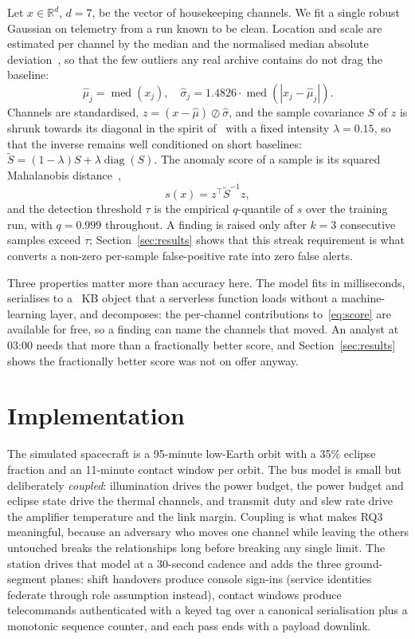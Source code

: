 \documentclass[10pt,journal]{IEEEtran}
\begin{document}
Let $x \in \mathbb{R}^{d}$, $d = 7$, be the vector of housekeeping channels. We
fit a single robust Gaussian on telemetry from a run known to be clean.
Location and scale are estimated per channel by the median and the normalised
median absolute deviation~\cite{rousseeuw1993mad}, so that the few outliers any
real archive contains do not drag the baseline:
\begin{equation}
\hat{\mu}_j = \operatorname{med}(x_j), \quad
\hat{\sigma}_j = 1.4826 \cdot \operatorname{med}\!\left(|x_j - \hat{\mu}_j|\right).
\end{equation}
Channels are standardised, $z = (x - \hat{\mu}) \oslash \hat{\sigma}$, and the
sample covariance $S$ of $z$ is shrunk towards its diagonal in the spirit
of~\cite{ledoit2004wellconditioned} with a fixed intensity $\lambda = 0.15$, so
that the inverse remains well conditioned on short baselines:
$\tilde{S} = (1 - \lambda) S + \lambda \operatorname{diag}(S)$. The anomaly
score of a sample is its squared Mahalanobis
distance~\cite{mahalanobis1936},
\begin{equation}
s(x) = z^{\top} \tilde{S}^{-1} z,
\label{eq:score}
\end{equation}
and the detection threshold $\tau$ is the empirical $q$-quantile of $s$ over
the training run, with $q = 0.999$ throughout. A finding is raised only after
$k = 3$ consecutive samples exceed $\tau$; Section~\ref{sec:results} shows that
this streak requirement is what converts a non-zero per-sample false-positive
rate into zero false alerts.

Three properties matter more than accuracy here. The model fits in
milliseconds, serialises to a \expModelKb~KB object that a serverless function
loads without a machine-learning layer, and decomposes: the per-channel
contributions to~\eqref{eq:score} are available for free, so a finding can name
the channels that moved. An analyst at 03:00 needs that more than a
fractionally better score, and Section~\ref{sec:results} shows the fractionally
better score was not on offer anyway.

\section{Implementation}
\label{sec:impl}

The simulated spacecraft is a 95-minute low-Earth orbit with a 35\% eclipse
fraction and an 11-minute contact window per orbit. The bus model is small but
deliberately \emph{coupled}: illumination drives the power budget, the power
budget and eclipse state drive the thermal channels, and transmit duty and slew
rate drive the amplifier temperature and the link margin. Coupling is what
makes RQ3 meaningful, because an adversary who moves one channel while leaving
the others untouched breaks the relationships long before breaking any single
limit. The
station drives that model at a 30-second cadence and adds the three
ground-segment planes: shift handovers produce console sign-ins (service
identities federate through role assumption instead), contact windows produce
telecommands authenticated with a keyed tag over a canonical serialisation plus
a monotonic sequence counter, and each pass ends with a payload downlink.
\end{document}
